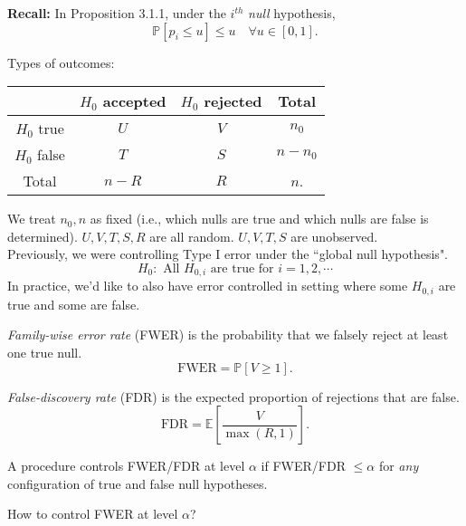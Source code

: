 \documentclass[a4paper]{article}
\begin{document}
\noindent \textbf{Recall:} In Proposition 3.1.1, under the $i^{th}$ \emph{null} hypothesis,
\begin{equation}
	\mathbb{P}[p_i \leq u] \leq u \quad \forall u \in [0,1].
\end{equation}

\noindent Types of outcomes:
\begin{center}
	\begin{tabular}{c | c  c | c}
		\toprule
		& $H_0$ accepted & $H_0$ rejected & Total \\
		\midrule
		$H_0$ true & $U$ & $V$ & $n_0$ \\
		$H_0$ false & $T$ & $S$ & $n-n_0$ \\
		\midrule
		Total & $n-R$ & $R$ & $n$. \\
		\bottomrule
	\end{tabular}
\end{center}
We treat $n_0,n$ as fixed (i.e., which nulls are true and which nulls are false is determined). $U,V,T,S,R$ are all random. $U,V,T,S$ are unobserved. \\
Previously, we were controlling Type I error under the ``global null hypothesis".
\begin{equation*}
	H_0: \text{ All } H_{0,i} \text{ are true for } i =1,2, \cdots
\end{equation*}
In practice, we'd like to also have error  controlled in setting where some $H_{0,i}$ are true and some are false.

\begin{defi}
	\emph{Family-wise error rate} (FWER) is the probability that we falsely reject at least one true null.
	\begin{equation}
		\text{FWER} = \mathbb{P}[V \geq 1].
	\end{equation}
\end{defi}
\begin{defi}
	\emph{False-discovery rate} (FDR) is the expected proportion of rejections that are false.
	\begin{equation}
		\text{FDR} = \mathbb{E}\left[\frac{V}{\max(R,1)}\right].
	\end{equation}
\end{defi}
\noindent A procedure controls FWER/FDR at level $\alpha$ if FWER/FDR $\leq \alpha$ for \emph{any} configuration of true and false null hypotheses.

\begin{question}
	How to control FWER at level $\alpha$?
\end{question}
\end{document}
